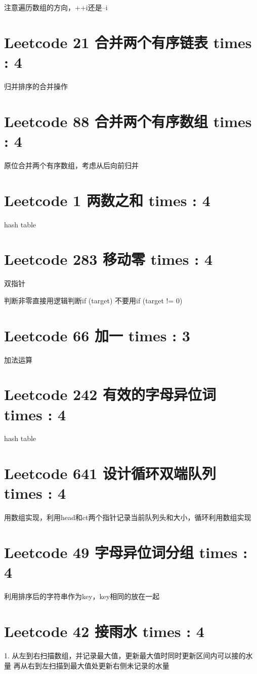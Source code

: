 \documentclass[UTF8]{ctexart}
\begin{document}
注意遍历数组的方向，++i还是--i

\section{Leetcode 21 合并两个有序链表 times : 4}
归并排序的合并操作

\section{Leetcode 88 合并两个有序数组 times : 4}
原位合并两个有序数组，考虑从后向前归并

\section{Leetcode 1 两数之和 times : 4}
hash table

\section{Leetcode 283 移动零 times : 4}
双指针

判断非零直接用逻辑判断if (target) 不要用if (target != 0)

\section{Leetcode 66 加一 times : 3}
加法运算

\section{Leetcode 242 有效的字母异位词 times : 4}
hash table

\section{Leetcode 641 设计循环双端队列 times : 4}
用数组实现，利用head和ct两个指针记录当前队列头和大小，循环利用数组实现

\section{Leetcode 49 字母异位词分组 times : 4}
利用排序后的字符串作为key，key相同的放在一起

\section{Leetcode 42 接雨水 times : 4}
1. 从左到右扫描数组，并记录最大值，更新最大值时同时更新区间内可以接的水量
再从右到左扫描到最大值处更新右侧未记录的水量
\end{document}
